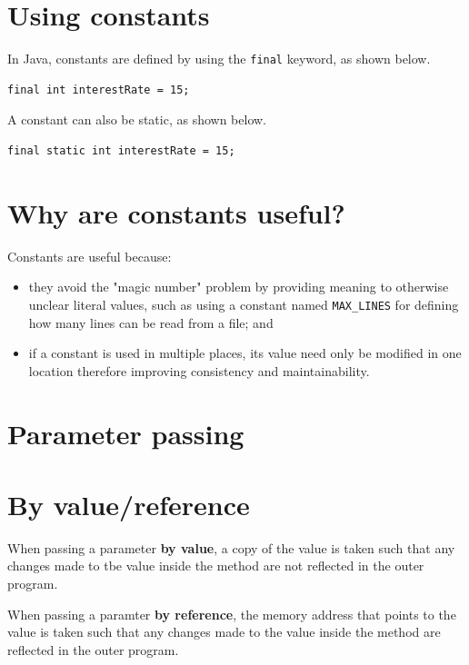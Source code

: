 \documentclass[a4paper]{systems-software}
\begin{document}
\section*{Using constants}

In Java, constants are defined by using the \texttt{final} keyword, as shown below.

\begin{lstlisting}[title={Defining a constant.}]
final int interestRate = 15;
\end{lstlisting}

A constant can also be static, as shown below.

\begin{lstlisting}[title={Defining a static constant.}]
final static int interestRate = 15;
\end{lstlisting}


\section*{Why are constants useful?}

Constants are useful because:
\begin{itemize}
	\item they avoid the "magic number" problem by providing meaning to otherwise unclear literal values, such as using a constant named \texttt{MAX\_LINES} for defining how many lines can be read from a file; and
	\item if a constant is used in multiple places, its value need only be modified in one location therefore improving consistency and maintainability.
\end{itemize}


\section{Parameter passing}

\section*{By value/reference}

When passing a parameter \textbf{by value}, a copy of the value is taken such that any changes made to tbe value inside the method are not reflected in the outer program.

When passing a paramter \textbf{by reference}, the memory address that points to the value is taken such that any changes made to the value inside the method are reflected in the outer program.
\end{document}
